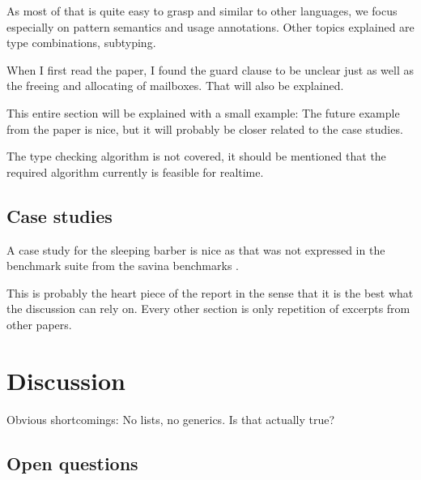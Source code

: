 As most of that is quite easy to grasp and similar to other languages, we focus especially on pattern semantics and usage annotations.
Other topics explained are type combinations, subtyping.

When I first read the paper, I found the guard clause to be unclear just as well as the freeing and allocating of mailboxes. That will also be explained.

This entire section will be explained with a small example: The future example from the paper is nice, but it will probably be closer related to the case studies.

The type checking algorithm is not covered, it should be mentioned that the required algorithm currently is feasible for realtime.

\subsection{Case studies}

A case study for the sleeping barber is nice as that was not expressed in the benchmark suite from the savina benchmarks \cite{imamSavinaActorBenchmark2014}.

This is probably the heart piece of the report in the sense that it is the best what the discussion can rely on. Every other section is only repetition of excerpts from other papers. 



\section{Discussion}
\label{sec:discussion}


Obvious shortcomings: No lists, no generics.
Is that actually true?

\subsection{Open questions}


